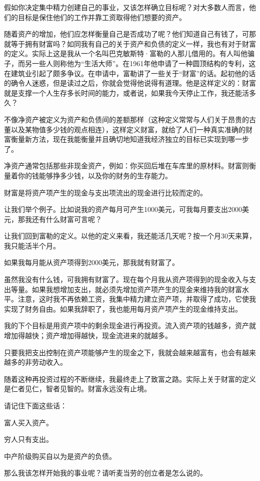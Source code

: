 假如你决定集中精力创建自己的事业，又该怎样确立目标呢？对大多数人而言，他们的目标是保住他们的工作并靠工资取得他们想要的资产。

随着资产的增加，他们应怎样衡量自己是否成功了呢？他们知道自己有钱了，可那就等于拥有财富吗？如同我有自己的关于资产和负债的定义一样，我也有对于财富的定义。实际上这是我从一个名叫巴克敏斯特·富勒的人那儿借用的。有人叫他骗子，而另一些人则称他为“生活大师”。在1961年他申请了一种圆顶结构的专利，这在建筑业引起了颇多争议。在申请中，富勒讲了一些关于“财富”的话。起初他的话的确令人迷惑，但是读过之后，你就会觉得他说得有道理。他是这样定义的：财富就是支撑一个人生存多长时间的能力，或者说，如果我今天停止工作，我还能活多久？

不像净资产被定义为资产和负债间的差额那样（这种定义常常与人们关于昂贵的古董以及某物值多少钱的观点相连），这样定义财富，就给了人们一种真实准确的财富衡量新方法，现在我能衡量并且确切地知道我经济独立的目标已实现到哪一步了。

净资产通常包括那些非现金资产，例如：你买回后堆在车库里的原材料。财富则衡量着你的钱能够挣多少钱，以及你的财务的生存能力。

财富是将资产项产生的现金与支出项流出的现金进行比较而定的。

让我们举个例子。比如说我的资产每月可产生1000美元，可我每月要支出2000美元，那我还有什么财富可言呢？

让我们回到富勒的定义。以他的定义来看，我还能活几天呢？按一个月30天来算，我只能活半个月。

如果我每月能从资产项得到2000美元，那我就有财富了。

虽然我没有什么钱，可我拥有财富了。现在每个月我从资产项得到的现金收入与支出等量。如果我想增加支出，就必须先增加资产项产生的现金来维持我的财富水平。注意，这时我不再依赖工资，我集中精力建立资产项，并取得了成功，它使我实现了财务自由。如果我辞职了，我也能用每月资产项产生的现金维持支出。

我的下个目标是用资产项中的剩余现金进行再投资。流入资产项的钱越多，资产就增加得越快；资产增加得越快，现金流进来的就越多。

只要我把支出控制在资产项能够产生的现金之下，我就会越来越富有，也会有越来越多的非劳动收入。

随着这种再投资过程的不断继续，我最终走上了致富之路。实际上关于财富的定义是仁者见仁，智者见智的。财富永远没有止境。

请记住下面这些话：

\begin{center}
{\kaishu
富人买入资产。

穷人只有支出。

中产阶级购买自以为是资产的负债。}
\end{center}

那么我该怎样开始我的事业呢？请听麦当劳的创立者是怎么说的。
